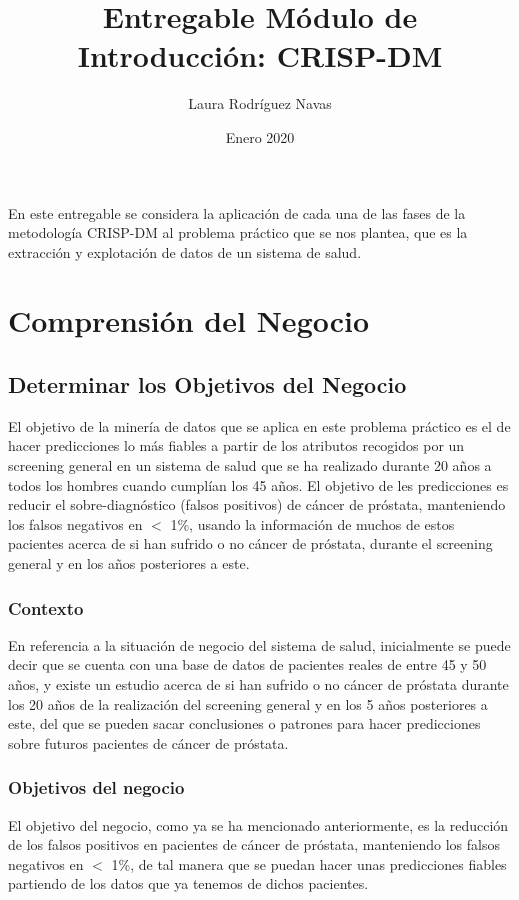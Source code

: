 \documentclass{article}
\title{Entregable Módulo de Introducción: CRISP-DM}
\author{Laura Rodríguez Navas}
\date{Enero 2020}
\begin{document}
\maketitle

En este entregable se considera la aplicación de cada una de las fases de la metodología CRISP-DM al problema práctico que se nos plantea, que es la extracción y explotación de datos de un sistema de salud.

\section{Comprensión del Negocio}

\subsection{Determinar los Objetivos del Negocio}
El objetivo de la minería de datos que se aplica en este problema práctico es el de hacer predicciones lo más fiables a partir de los atributos recogidos por un screening general en un sistema de salud que se ha realizado durante 20 años a todos los hombres cuando cumplían los 45 años. El objetivo de les predicciones es reducir el sobre-diagnóstico (falsos positivos) de cáncer de próstata, manteniendo los falsos negativos en $<$ 1\%, usando la información de muchos de estos pacientes acerca de si han sufrido o no cáncer de próstata, durante el screening general y en los años posteriores a este.

\subsubsection{Contexto}
En referencia a la situación de negocio del sistema de salud, inicialmente se puede decir que se cuenta con una base de datos de pacientes reales de entre 45 y 50 años, y existe un estudio acerca de si han sufrido o no cáncer de próstata durante los 20 años de la realización del screening general y en los 5 años posteriores a este, del que se pueden sacar conclusiones o patrones para hacer predicciones sobre futuros pacientes de cáncer de próstata.

\subsubsection{Objetivos del negocio}
El objetivo del negocio, como ya se ha mencionado anteriormente, es la reducción de los falsos positivos en pacientes de cáncer de próstata, manteniendo los falsos negativos en $<$ 1\%, de tal manera que se puedan hacer unas predicciones fiables partiendo de los datos que ya tenemos de dichos pacientes. 
\end{document}
